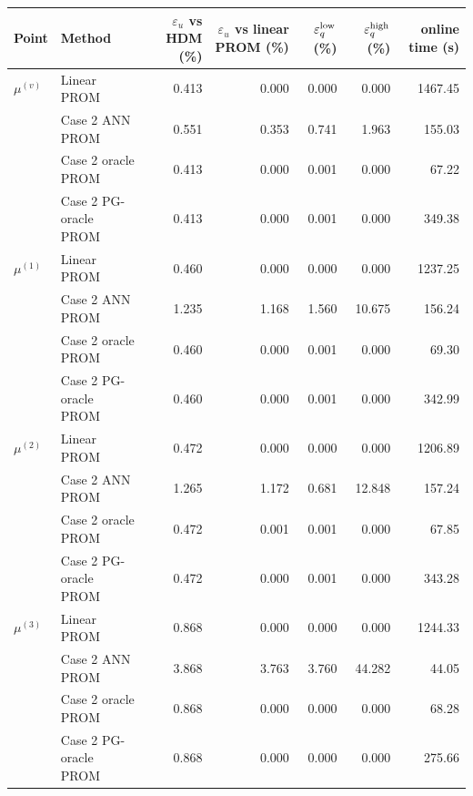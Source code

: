\begin{tabular}{llrrrrr}
\toprule
Point & Method & $\varepsilon_u$ vs HDM (\%) & $\varepsilon_u$ vs linear PROM (\%) & $\varepsilon_q^{\rm low}$ (\%) & $\varepsilon_q^{\rm high}$ (\%) & online time (s) \\
\midrule
$\mu^{(v)}$ & Linear PROM & 0.413 & 0.000 & 0.000 & 0.000 & 1467.45 \\
 & Case 2 ANN PROM & 0.551 & 0.353 & 0.741 & 1.963 & 155.03 \\
 & Case 2 oracle PROM & 0.413 & 0.000 & 0.001 & 0.000 & 67.22 \\
 & Case 2 PG-oracle PROM & 0.413 & 0.000 & 0.001 & 0.000 & 349.38 \\
\midrule
$\mu^{(1)}$ & Linear PROM & 0.460 & 0.000 & 0.000 & 0.000 & 1237.25 \\
 & Case 2 ANN PROM & 1.235 & 1.168 & 1.560 & 10.675 & 156.24 \\
 & Case 2 oracle PROM & 0.460 & 0.000 & 0.001 & 0.000 & 69.30 \\
 & Case 2 PG-oracle PROM & 0.460 & 0.000 & 0.001 & 0.000 & 342.99 \\
\midrule
$\mu^{(2)}$ & Linear PROM & 0.472 & 0.000 & 0.000 & 0.000 & 1206.89 \\
 & Case 2 ANN PROM & 1.265 & 1.172 & 0.681 & 12.848 & 157.24 \\
 & Case 2 oracle PROM & 0.472 & 0.001 & 0.001 & 0.000 & 67.85 \\
 & Case 2 PG-oracle PROM & 0.472 & 0.000 & 0.001 & 0.000 & 343.28 \\
\midrule
$\mu^{(3)}$ & Linear PROM & 0.868 & 0.000 & 0.000 & 0.000 & 1244.33 \\
 & Case 2 ANN PROM & 3.868 & 3.763 & 3.760 & 44.282 & 44.05 \\
 & Case 2 oracle PROM & 0.868 & 0.000 & 0.000 & 0.000 & 68.28 \\
 & Case 2 PG-oracle PROM & 0.868 & 0.000 & 0.000 & 0.000 & 275.66 \\
\bottomrule
\end{tabular}
